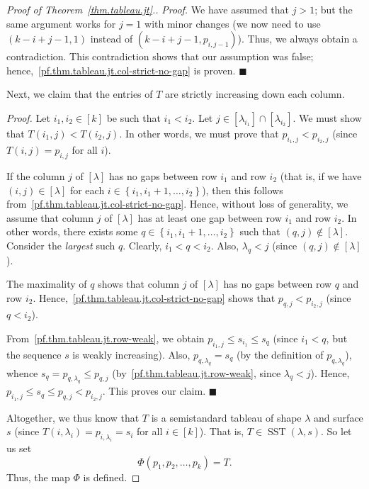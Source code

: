 \documentclass[reqno]{amsart}
\newcommand{\0}{\phantom{c}}
\newcommand{\diag}[1]{\left[#1\right]} %
\DeclareMathOperator{\SST}{SST} %
\newenvironment{subproof}{\textit{Proof.} }{\hfill$\blacksquare$ \medskip}
\newenvironment{verlong}{}{}
\newcommand{\set}[1]{\left\{ #1 \right\}}
\newcommand{\tup}[1]{\left( #1 \right)}
\newcommand{\ive}[1]{\left[ #1 \right]}
\theoremstyle{plain}
\theoremstyle{definition}
\numberwithin{equation}{section}
\begin{document}
\begin{verlong}
\begin{proof}[Proof of Theorem~\ref{thm.tableau.jt}.]
\begin{subproof}
We have assumed that $j > 1$; but the same argument works for $j = 1$ with minor 
changes
(we now need to use $\tup{k-i+j-1, 1}$ instead of $\tup{k-i+j-1, p_{i,j-1}}$).
Thus, we always obtain a contradiction.
This contradiction shows that our assumption was false; hence,~\eqref{pf.thm.tableau.jt.col-strict-no-gap} is proven.
\end{subproof}

Next, we claim that the entries of $T$ are strictly increasing down each column.

\begin{subproof}
Let $i_1,i_2\in\ive{k}$ be such that $i_1 < i_2$.
Let $j \in \ive{\lambda_{i_1}} \cap \ive{\lambda_{i_2}}$.
We must show that $T( i_1,j) < T(i_2, j)$.
In other words, we must prove that $p_{i_1,j} < p_{i_2,j}$ (since $T(i,j) = p_{i,j}$ for all $i$).

If the column $j$ of $\diag{\lambda}$ has no gaps between row $i_1$ and row $i_2$ (that is, if we have $(i,j) \in \diag{\lambda}$ for each $i \in \set{i_1, i_1+1, \dotsc, i_2}$), then this follows from~\eqref{pf.thm.tableau.jt.col-strict-no-gap}.
Hence, without loss of generality, we assume that column $j$ of $\diag{\lambda}$ has at least one gap between row $i_1$ and row $i_2$.
In other words, there exists some $q \in \set{i_1, i_1+1, \dotsc, i_2}$ such that $(q,j) \notin \diag{\lambda}$.
Consider the \emph{largest} such $q$.
Clearly, $i_1 < q < i_2$.
Also, $\lambda_{q} < j$ (since $(q,j) \notin \diag{\lambda}$).

The maximality of $q$ shows that column $j$ of $\diag{\lambda}$ has no gaps between row $q$ and row $i_2$.
Hence,~\eqref{pf.thm.tableau.jt.col-strict-no-gap} shows that $p_{q,j}<p_{i_2,j}$ (since $q<i_2$).

From~\eqref{pf.thm.tableau.jt.row-weak}, we obtain $p_{i_1,j} \leq s_{i_1} \leq s_{q}$ (since $i_1 < q$, but the sequence $s$ is weakly increasing).
Also, $p_{q,\lambda_{q}} = s_{q}$ (by the definition of $p_{q,\lambda_{q}}$), whence $s_{q} = p_{q,\lambda_{q}} \leq p_{q,j}$ (by~\eqref{pf.thm.tableau.jt.row-weak}, since $\lambda_{q} < j$).
Hence, $p_{i_1,j} \leq s_{q} \leq p_{q,j} < p_{i_2,j}$. This proves our claim.
\end{subproof}

Altogether, we thus know that $T$ is a semistandard tableau of shape $\lambda$ and surface $s$ (since $T(i, \lambda_i) = p_{i,\lambda_i} = s_i$ for all $i \in \ive{k}$).
That is, $T \in \SST(\lambda, s)$.
So let us set
\[
\Phi(p_1, p_2, \dotsc, p_k) = T.
\]
Thus, the map $\Phi$ is defined.


\end{proof}
\end{verlong}
\end{document}
